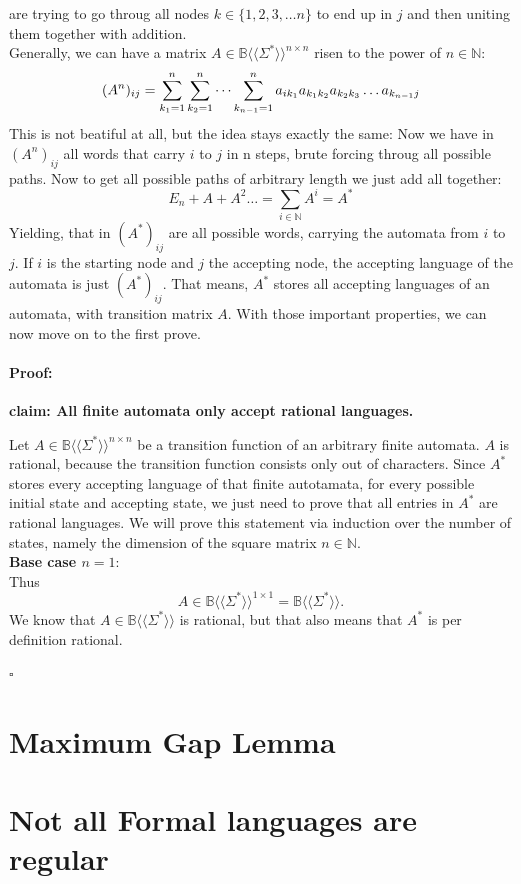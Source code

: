 \documentclass[12pt,letterpaper]{article}
\newenvironment{proof}{\paragraph{Proof:}}{\hfill$\square$}
\newcommand{\fps}[1] {
\mathbb{#1}\langle \langle \Sigma^* \rangle \rangle
}
\begin{document}
are trying to go throug all nodes $k \in \{1, 2, 3, \dots n\}$
to end up in $j$ and then uniting them together with addition.\\
Generally, we can have a matrix $A \in \fps{B}^{n \times n}$
risen to the power of $n \in \mathbb{N}$:
\[
  (A^n)_{ij} = \sum_{k_1=1}^{n}
    \sum_{k_2=1}^{n}\dots \sum_{k_{n-1}=1}^n 
    a_{ik_1}a_{k_1k_2}a_{k_2k_3}\dots a_{k_{n-1}j} \\
\]
This is not beatiful at all, but the idea stays exactly the same: Now
we have in $(A^n)_{ij}$ all words that carry $i$ to $j$ in n steps,
brute forcing throug all possible paths. Now to get all possible paths
of arbitrary length we just add all together:
\[
  E_n + A + A^2 \dots = \sum_{i \in \mathbb{N}} A^i = A^*
\]
Yielding, that in $(A^*)_{ij}$ are all possible words, carrying
the automata from $i$ to $j$. If $i$ is the starting node and $j$
the accepting node, the accepting language of the automata is just
$(A^*)_{ij}$. That means, $A^*$ stores all accepting languages of 
an automata, with transition matrix $A$.
With those important properties, we can now move on to the first prove.
\begin{proof}
  \begin{center}
    {\bf claim: All finite automata only accept rational languages.}
  \end{center}
  Let $A \in \fps{B}^{n \times n}$ be a transition function of an
  arbitrary finite automata. $A$ is rational, because the transition
  function consists only out of characters. Since $A^*$ stores every accepting
  language of that finite autotamata, for every possible initial
  state and accepting state, we just need to prove that all entries
  in $A^*$ are rational languages.
  We will prove this statement via induction over the number of 
  states, namely the dimension of the square matrix $n \in \mathbb{N}$.\\
  {\bf Base case $n=1$}:\\
  Thus
  \[
    A \in \fps{B}^{1 \times 1} = \fps{B}.
  \]
  We know that $A \in \fps{B}$ is rational, but that also means
  that $A^*$ is per definition rational. 

\end{proof}
  


\section{Maximum Gap Lemma}
\section{Not all Formal languages are regular}
\end{document}

